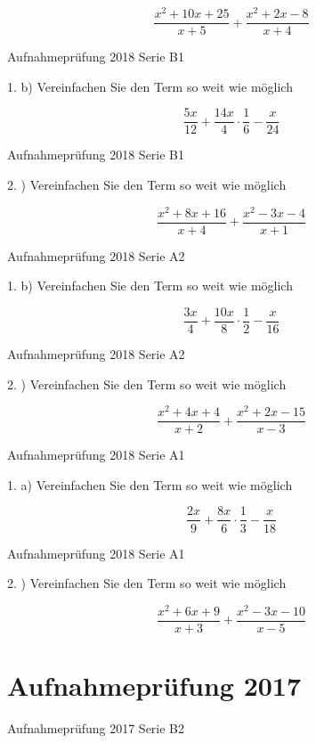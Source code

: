 {$$\frac{x^2+10x+25}{x+5} + \frac{x^2+2x-8}{x+4}$$

Aufnahmeprüfung 2018 Serie B1

1. b) Vereinfachen Sie den Term so weit wie möglich

$$\frac{5x}{12} + \frac{14x}{4} \cdot{} \frac16 - \frac{x}{24}$$

Aufnahmeprüfung 2018 Serie B1

2. ) Vereinfachen Sie den Term so weit wie möglich

$$\frac{x^2+8x+16}{x+4} + \frac{x^2-3x-4}{x+1}$$

Aufnahmeprüfung 2018 Serie A2

1. b) Vereinfachen Sie den Term so weit wie möglich

$$\frac{3x}4 + \frac{10x}8 \cdot{} \frac12 - \frac{x}{16}$$

Aufnahmeprüfung 2018 Serie A2

2. ) Vereinfachen Sie den Term so weit wie möglich

$$\frac{x^2+4x+4}{x+2} + \frac{x^2+2x-15}{x-3}$$

Aufnahmeprüfung 2018 Serie A1

1. a) Vereinfachen Sie den Term so weit wie möglich

$$\frac{2x}9 + \frac{8x}6 \cdot{} \frac13 - \frac{x}{18}$$

Aufnahmeprüfung 2018 Serie A1

2. ) Vereinfachen Sie den Term so weit wie möglich

$$\frac{x^2+6x+9}{x+3} + \frac{x^2-3x-10}{x-5}$$

\section*{Aufnahmeprüfung 2017}
Aufnahmeprüfung 2017 Serie B2

}
